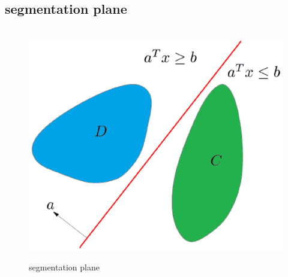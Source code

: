 \documentclass[oneside, 12pt]{ctexbook}
\begin{document}
			\subsection{\quad segmentation plane}
				\begin{figure}[H]
					\vspace{-0.2cm}  %
					\setlength{\abovecaptionskip}{-0.2cm}   %
					\centering
					\includegraphics[scale=0.6]{segmentation_plane.png}
					\renewcommand{\figurename}{Fig} %
					\caption{segmentation plane}
					\label{fig:3}
				\end{figure}
			
\end{document}
